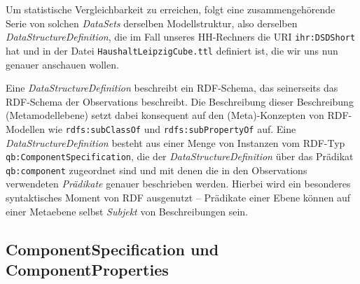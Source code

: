 \documentclass[a4paper,11pt,twoside]{article}
\begin{document}
Um statistische Vergleichbarkeit zu erreichen, folgt eine zusammengehörende
Serie von solchen \emph{DataSets} derselben Modellstruktur, also derselben
\emph{DataStructureDefinition}, die im Fall unseres HH-Rechners die URI
\texttt{ihr:DSDShort} hat und in der Datei \texttt{HaushaltLeipzigCube.ttl}
definiert ist, die wir uns nun genauer anschauen wollen.

Eine \emph{DataStructureDefinition} beschreibt ein RDF-Schema, das seinerseits
das RDF-Schema der Observations beschreibt. Die Beschreibung dieser
Beschreibung (Metamodellebene) setzt dabei konsequent auf den (Meta)-Konzepten
von RDF-Modellen \cite{RDFS} wie \texttt{rdfs:subClassOf} und
\texttt{rdfs:subPropertyOf} auf.  Eine \emph{DataStructureDefinition} besteht
aus einer Menge von Instanzen vom RDF-Typ \texttt{qb:ComponentSpecification},
die der \emph{DataStructureDefinition} über das Prädikat \texttt{qb:component}
zugeordnet sind und mit denen die in den Observations verwendeten
\emph{Prädikate} genauer beschrieben werden. Hierbei wird ein besonderes
syntaktisches Moment von RDF ausgenutzt -- Prädikate einer Ebene können auf
einer Metaebene selbst \emph{Subjekt} von Beschreibungen sein. 

\subsection{ComponentSpecification und ComponentProperties}
\end{document}
